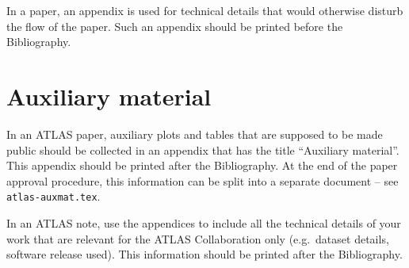 \documentclass[UKenglish,texlive=2013]{\ATLASLATEXPATH atlasdoc}
\begin{document}
In a paper, an appendix is used for technical details that would otherwise disturb the flow of the paper.
Such an appendix should be printed before the Bibliography.


\printbibliography
%
%

\clearpage
{}

\clearpage
\appendix
\part*{Auxiliary material}

In an ATLAS paper, auxiliary plots and tables that are supposed to be made public 
should be collected in an appendix that has the title \enquote{Auxiliary material}.
This appendix should be printed after the Bibliography.
At the end of the paper approval procedure, this information can be split into a separate document
-- see \texttt{atlas-auxmat.tex}.

In an ATLAS note, use the appendices to include all the technical details of your work
that are relevant for the ATLAS Collaboration only (e.g.\ dataset details, software release used).
This information should be printed after the Bibliography.
\end{document}
